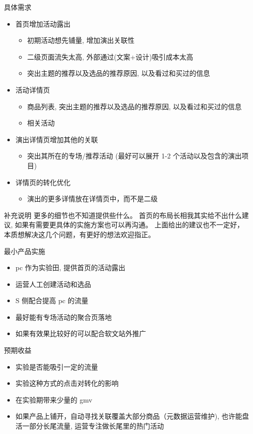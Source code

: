 \documentclass[presentation,bigger]{beamer}
\begin{document}
\begin{frame}[allowframebreaks]{具体需求}
\begin{itemize}
\item 首页增加活动露出
\begin{itemize}
\item 初期活动想先铺量, 增加演出关联性
\item 二级页面流失太高, 外部通过(文案+设计)吸引成本太高
\item 突出主题的推荐以及选品的推荐原因, 以及看过和买过的信息
\end{itemize}

\item 活动详情页
\begin{itemize}
\item 商品列表, 突出主题的推荐以及选品的推荐原因, 以及看过和买过的信息
\item 相关活动
\end{itemize}
\end{itemize}

\framebreak

\begin{itemize}
\item 演出详情页增加其他的关联
\begin{itemize}
\item 突出其所在的专场/推荐活动 (最好可以展开 1-2 个活动以及包含的演出项目)
\end{itemize}

\item 详情页的转化优化
\begin{itemize}
\item 演出的更多详情放在详情页中，而不是二级
\end{itemize}
\end{itemize}

\begin{block}{补充说明}
更多的细节也不知道提供些什么。
首页的布局长相我其实给不出什么建议, 如果有需要更具体的实施方案也可以再沟通。
上面给出的建议也不一定好， 本质想解决这几个问题，有更好的想法欢迎指正。
\end{block}
\end{frame}

\begin{frame}[label={sec:orgheadline3}]{最小产品实施}
\begin{itemize}
\item pc 作为实验田, 提供首页的活动露出
\item 运营人工创建活动和选品
\item S 侧配合提高 pc 的流量
\item 最好能有专场活动的聚合页落地
\item 如果有效果比较好的可以配合软文站外推广
\end{itemize}
\end{frame}

\begin{frame}[label={sec:orgheadline4}]{预期收益}
\begin{itemize}
\item 实验是否能吸引一定的流量
\item 实验这种方式的点击对转化的影响
\item 在实验期带来少量的 gmv
\item 如果产品上铺开，自动寻找关联覆盖大部分商品（元数据运营维护), 也许能盘活一部分长尾流量, 运营专注做长尾里的热门活动
\end{itemize}
\end{frame}
\end{document}
